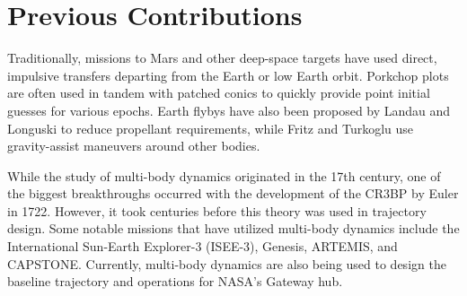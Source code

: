 \section{Previous Contributions}
Traditionally, missions to Mars and other deep-space targets have used direct,
impulsive transfers departing from the Earth or low Earth orbit. Porkchop plots are often used in
tandem with patched conics to quickly provide point initial guesses for various
epochs\cite{Drake:2009}. Earth flybys have also been proposed by Landau and Longuski to reduce
propellant requirements\cite{Landau:2006}, while Fritz and Turkoglu use gravity-assist maneuvers
around other bodies\cite{Fritz:2016}.

While the study of multi-body dynamics originated in the 17th century, one of the biggest
breakthroughs occurred with the development of the CR3BP by Euler in 1722\cite{BarrowGreen:1997}.
However, it took centuries before this theory was used in trajectory design. Some notable missions
that have utilized multi-body dynamics include the International Sun-Earth Explorer-3
(ISEE-3)\cite{Farquhar:1984}, Genesis\cite{Lo:2001}, ARTEMIS\cite{Woodard:2009}, and
CAPSTONE\cite{Cheetham:2021}. Currently, multi-body dynamics are also being used to design the
baseline trajectory and operations for NASA's Gateway
hub\cite{Zamora:2024,Boudad:2022,ZimovanSpreen:2022}.


